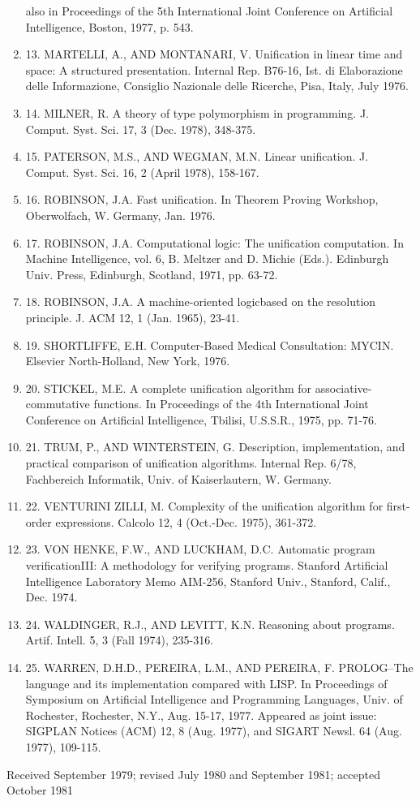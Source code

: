 \begin{enumerate}
also in Proceedings of the 5th International Joint Conference on Artificial Intelligence, Boston,
1977, p. 543.
  \item
13. MARTELLI, A., AND MONTANARI, V. Unification in linear time and space: A structured 
presentation. Internal Rep. B76-16, Ist. di Elaborazione delle Informazione, Consiglio Nazionale delle
Ricerche, Pisa, Italy, July 1976.
  \item
14. MILNER, R. A theory of type polymorphism in programming. J. Comput. Syst. Sci. 17, 3 (Dec.
1978), 348-375.
  \item
15. PATERSON, M.S., AND WEGMAN, M.N. Linear unification. J. Comput. Syst. Sci. 16, 2 (April
1978), 158-167.
  \item
16. ROBINSON, J.A. Fast unification. In Theorem Proving Workshop, Oberwolfach, W. Germany,
Jan. 1976.
  \item
17. ROBINSON, J.A. Computational logic: The unification computation. In Machine Intelligence,
vol. 6, B. Meltzer and D. Michie (Eds.). Edinburgh Univ. Press, Edinburgh, Scotland, 1971, pp.
63-72.
  \item
18. ROBINSON, J.A. A machine-oriented logicbased on the resolution principle. J. ACM 12, 1 (Jan.
1965), 23-41.
  \item
19. SHORTLIFFE, E.H. Computer-Based Medical Consultation: MYCIN. Elsevier North-Holland,
New York, 1976.
  \item
20. STICKEL, M.E. A complete unification algorithm for associative-commutative functions. In
Proceedings of the 4th International Joint Conference on Artificial Intelligence, Tbilisi, U.S.S.R.,
1975, pp. 71-76.
  \item
21. TRUM, P., AND WINTERSTEIN, G. Description, implementation, and practical comparison of
unification algorithms. Internal Rep. 6/78, Fachbereich Informatik, Univ. of Kaiserlautern, W.
Germany.
  \item
22. VENTURINI ZILLI, M. Complexity of the unification algorithm for first-order expressions. Calcolo
12, 4 (Oct.-Dec. 1975), 361-372.
  \item
23. VON HENKE, F.W., AND LUCKHAM, D.C. Automatic program verificationIII: A methodology for
verifying programs. Stanford Artificial Intelligence Laboratory Memo AIM-256, Stanford Univ.,
Stanford, Calif., Dec. 1974.
  \item
24. WALDINGER, R.J., AND LEVITT, K.N. Reasoning about programs. Artif. Intell. 5, 3 (Fall 1974),
235-316.
  \item
25. WARREN, D.H.D., PEREIRA, L.M., AND PEREIRA, F. PROLOG--The language and its implementation
compared with LISP. In Proceedings of Symposium on Artificial Intelligence and
Programming Languages, Univ. of Rochester, Rochester, N.Y., Aug. 15-17, 1977. Appeared as
joint issue: SIGPLAN Notices (ACM) 12, 8 (Aug. 1977), and SIGART Newsl. 64 (Aug. 1977),
109-115.
  
\end{enumerate}

Received September 1979; revised July 1980 and September 1981; accepted October 1981 
